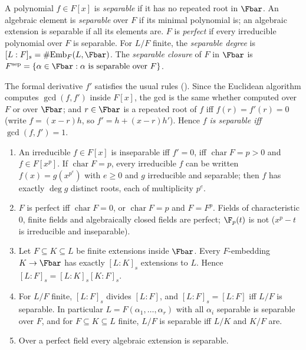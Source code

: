 \begin{definition}[Separability]\label{def:galois:separable}
A polynomial $f\in F[x]$ is \emph{separable} if it has no repeated root in $\Fbar$. An algebraic element is \emph{separable} over $F$ if its minimal polynomial
is; an algebraic extension is separable if all its elements are. $F$ is \emph{perfect} if every irreducible polynomial over $F$ is separable. For $L/F$
finite, the \emph{separable degree} is $[L:F]_s=\#\mathrm{Emb}_F(L,\Fbar)$. The \emph{separable closure} of $F$ in $\Fbar$ is
$F^{\mathrm{sep}}=\{\alpha\in\Fbar:\alpha\text{ is separable over }F\}$.
\end{definition}

The formal derivative $f'$ satisfies the usual rules (). Since the Euclidean algorithm computes $\gcd(f,f')$ inside $F[x]$, the gcd is the same
whether computed over $F$ or over $\Fbar$; and $r\in\Fbar$ is a repeated root of $f$ iff $f(r)=f'(r)=0$ (write $f=(x-r)h$, so $f'=h+(x-r)h'$). Hence
\emph{$f$ is separable iff $\gcd(f,f')=1$}.

\begin{proposition}[Separability]\label{prop:galois:separability}
\begin{enumerate}[label=(\alph*)]
\item An irreducible $f\in F[x]$ is inseparable iff $f'=0$, iff $\operatorname{char}F=p>0$ and $f\in F[x^p]$. If $\operatorname{char}F=p$, every irreducible $f$
can be written $f(x)=g(x^{p^e})$ with $e\ge0$ and $g$ irreducible and separable; then $f$ has exactly $\deg g$ distinct roots, each of multiplicity $p^e$.
\item $F$ is perfect iff $\operatorname{char}F=0$, or $\operatorname{char}F=p$ and $F=F^p$. Fields of characteristic $0$, finite fields and algebraically
closed fields are perfect; $\F_p(t)$ is not ($x^p-t$ is irreducible and inseparable).
\item Let $F\subseteq K\subseteq L$ be finite extensions inside $\Fbar$. Every $F$-embedding $K\to\Fbar$ has exactly $[L:K]_s$ extensions to $L$. Hence
$[L:F]_s=[L:K]_s[K:F]_s$.
\item For $L/F$ finite, $[L:F]_s$ divides $[L:F]$, and $[L:F]_s=[L:F]$ iff $L/F$ is separable. In particular $L=F(\alpha_1,\dots,\alpha_r)$ with all $\alpha_i$
separable is separable over $F$, and for $F\subseteq K\subseteq L$ finite, $L/F$ is separable iff $L/K$ and $K/F$ are.
\item Over a perfect field every algebraic extension is separable.
\end{enumerate}
\end{proposition}

